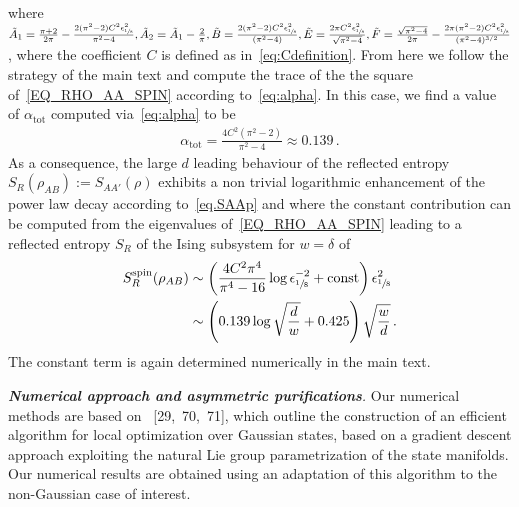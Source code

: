 \documentclass[prl,a4paper,notitlepage,twocolumn,superscriptaddress,longbibliography,reprint]{revtex4-2}
\newcommand{\mysection}[1]{{\vspace{10 pt}\noindent \emph{{\textbf{#1}}.}}}
\begin{document}
where $\tilde{A}_{1}=\frac{\pi+2}{2\pi}-\frac{2(\pi^{2}-2)C^{2}\epsilon^{2}_{\sfrac{1}{8}}}{\pi^{2}-4},\tilde{A}_{2}=\tilde{A}_{1}-\frac{2}{\pi},\tilde{B}=\frac{2(\pi^{2}-2)C^{2}\epsilon^{2}_{\sfrac{1}{8}}}{(\pi^{2}-4)},\tilde{E}=\frac{2\pi C^{2}\epsilon^{2}_{\sfrac{1}{8}}}{\sqrt{\pi^{2}-4}},\tilde{F}=\frac{\sqrt{\pi^{2}-4}}{2\pi}-\frac{2\pi(\pi^{2}-2)C^{2}\epsilon^{2}_{\sfrac{1}{8}}}{(\pi^{2}-4)^{3/2}}$, where the coefficient $C$ is defined as in~\eqref{eq:Cdefinition}. From here we follow the strategy of the main text and compute the trace of the the square of~\eqref{EQ_RHO_AA_SPIN} according to~\eqref{eq:alpha}.
In this case, we find a value of $\alpha_{\mathrm{tot}}$ computed via~\eqref{eq:alpha} to be
\begin{align}
  \alpha_{\mathrm{tot}}=\frac{4C^{2}(\pi^{2}-2)}{\pi^{2}-4}\approx0.139 \,.\label{eq:alpha-RE-ISING}
\end{align}
As a consequence, the large $d$ leading behaviour of the reflected entropy $S_{R}(\rho_{AB}):=S_{AA'}(\rho)$ exhibits a non trivial logarithmic enhancement of the power law decay according to~\eqref{eq.SAAp} and where the constant contribution can be computed from the eigenvalues of~\eqref{EQ_RHO_AA_SPIN} leading to a reflected entropy $S_{R}$ of the Ising subsystem for $w=\delta$ of
\begin{align}\label{EQ_RE_SPIN_W1}
  S_{R}^\text{spin}(\rho_{AB}) &\sim 
  \left( \frac{4C^2\pi^4}{\pi^4 - 16} \log\epsilon_{\sfrac{1}{8}}^{-2} + \mathrm{const} \right)\epsilon_{\sfrac{1}{8}}^2 \nonumber\\
  &\sim \left(0.139\log\sqrt{\frac{d}{w}} + 0.425 \right) \sqrt{\frac{w}{d}}\, .
\end{align}
The constant term is again determined numerically in the main text.

\mysection{Numerical approach and asymmetric purifications}
Our numerical methods are based on%
~[29,~70,~71], which outline the construction of an efficient algorithm for local optimization over Gaussian states, based on a gradient descent approach exploiting the natural Lie group parametrization of the state manifolds. Our numerical results are obtained using an adaptation of this algorithm to the non-Gaussian case of interest.
\end{document}
